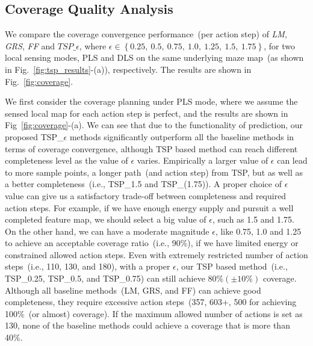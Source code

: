 \subsection{Coverage Quality Analysis}
We compare the coverage convergence performance~(per action step) of \textit{LM}, \textit{GRS}, \textit{FF} and $TSP\_\epsilon$, where $\epsilon \in \left \{ 0.25,~0.5,~0.75,~1.0,~1.25,~1.5,~1.75 \right \}$, for two local sensing modes, PLS and DLS on the same underlying maze map~(as shown in Fig.~\ref{fig:tsp_results}-(a)), respectively. The results are shown in Fig.~\ref{fig:coverage}. 

We first consider the coverage planning under PLS mode, where we assume the sensed local map for each action step is perfect, and the results are shown in Fig~\ref{fig:coverage}-(a). We can see that due to the functionality of prediction, our proposed TSP\_$\epsilon$ methods significantly outperform all the baseline methods in terms of coverage convergence, although TSP based method can reach different completeness level as the value of $\epsilon$ varies. Empirically a larger value of $\epsilon$ can lead to more sample points, a longer path~(and action step) from TSP, but as well as a better completeness~(i.e., TSP\_{1.5} and TSP\_(1.75)). A proper choice of $\epsilon$ value can give us a satisfactory trade-off between completeness and required action steps. For example, if we have enough energy supply and pursuit a well completed feature map, we should select a big value of $\epsilon$, such as 1.5 and 1.75. On the other hand, we can have a moderate magnitude $\epsilon$, like 0.75, 1.0 and 1.25 to achieve an acceptable coverage ratio~(i.e., 90\%), if we have limited energy or constrained allowed action steps. Even with extremely restricted number of action steps~(i.e., 110, 130, and 180), with a proper $\epsilon$, our TSP based method~(i.e., TSP\_{0.25}, TSP\_{0.5}, and TSP\_{0.75}) can still achieve $80\%(\pm 10\%)$ coverage. Although all baseline methods~(LM, GRS, and FF) can achieve good completeness, they require excessive action steps~(357, 603+, 500 for achieving 100\%~(or almost) coverage). If the maximum allowed number of actions is set as 130, none of the baseline methods could achieve a coverage that is more than 40\%.

